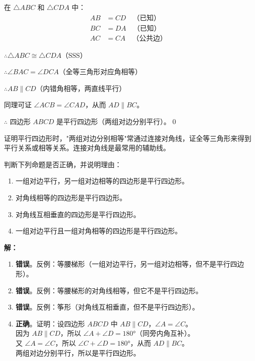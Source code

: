 \documentclass[12pt, a4paper]{ctexart}
\begin{document}
在 $\triangle ABC$ 和 $\triangle CDA$ 中：
\begin{align*}
AB &= CD \quad \text{（已知）}\\
BC &= DA \quad \text{（已知）}\\
AC &= CA \quad \text{（公共边）}
\end{align*}

$\therefore \triangle ABC \cong \triangle CDA$（SSS）

$\therefore \angle BAC = \angle DCA$（全等三角形对应角相等）

$\therefore AB \parallel CD$（内错角相等，两直线平行）

同理可证 $\angle ACB = \angle CAD$，从而 $AD \parallel BC$。

$\therefore$ 四边形 $ABCD$ 是平行四边形（两组对边分别平行）。\qed

\begin{tipbox}[方法总结]
证明平行四边形时，"两组对边分别相等"常通过连接对角线，证全等三角形来得到平行关系或相等关系。连接对角线是最常用的辅助线。
\end{tipbox}

\vspace{6pt}

\begin{examplebox}
判断下列命题是否正确，并说明理由：
\begin{enumerate}[label=(\arabic*)]
  \item 一组对边平行，另一组对边相等的四边形是平行四边形。
  \item 对角线相等的四边形是平行四边形。
  \item 对角线互相垂直的四边形是平行四边形。
  \item 一组对边平行且一组对角相等的四边形是平行四边形。
\end{enumerate}
\end{examplebox}

\textbf{解：}
\begin{enumerate}[label=(\arabic*)]
  \item \textbf{错误}。反例：等腰梯形（一组对边平行，另一组对边相等，但不是平行四边形）。
  \item \textbf{错误}。反例：等腰梯形的对角线相等，但它不是平行四边形。
  \item \textbf{错误}。反例：筝形（对角线互相垂直，但不是平行四边形）。
  \item \textbf{正确}。证明：设四边形 $ABCD$ 中 $AB \parallel CD$，$\angle A = \angle C$。\\
  因为 $AB \parallel CD$，所以 $\angle A + \angle D = 180°$（同旁内角互补）。\\
  又 $\angle A = \angle C$，所以 $\angle C + \angle D = 180°$，从而 $AD \parallel BC$。\\
  两组对边分别平行，所以是平行四边形。
\end{enumerate}
\end{document}
